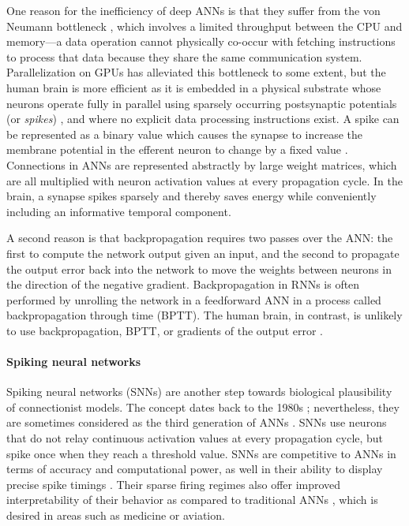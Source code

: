 One reason for the inefficiency of deep ANNs is that they suffer from the von Neumann bottleneck \citep{zenke2021brain}, which involves a limited throughput between the CPU and memory---a data operation cannot physically co-occur with fetching instructions to process that data because they share the same communication system.
Parallelization on GPUs has alleviated this bottleneck to some extent, but the human brain is more efficient as it is embedded in a physical substrate whose neurons operate fully in parallel \citep{a2017parallel} using sparsely occurring postsynaptic potentials (or \emph{spikes}) \citep{bear2020neuroscience}, and where no explicit data processing instructions exist.
A spike can be represented as a binary value which causes the synapse to increase the membrane potential in the efferent neuron to change by a fixed value \citep{bear2020neuroscience}.
Connections in ANNs are represented abstractly by large weight matrices, which are all multiplied with neuron activation values at every propagation cycle.
In the brain, a synapse spikes sparsely and thereby saves energy while conveniently including an informative temporal component.

A second reason is that backpropagation requires two passes over the ANN: the first to compute the network output given an input, and the second to propagate the output error back into the network to move the weights between neurons in the direction of the negative gradient.
Backpropagation in RNNs is often performed by unrolling the network in a feedforward ANN in a process called backpropagation through time (BPTT).
The human brain, in contrast, is unlikely to use backpropagation, BPTT, or gradients of the output error \citep{lillicrap2019backpropagation}.

\paragraph{Spiking neural networks}
Spiking neural networks (SNNs) \citep{maass1997networks,gerstner2002spiking} are another step towards biological plausibility of connectionist models.
The concept dates back to the 1980s \citep{hopfield1982neural}; nevertheless, they are sometimes considered as the third generation of ANNs \citep{maass1997networks}.
SNNs use neurons that do not relay continuous activation values at every propagation cycle, but spike once when they reach a threshold value.
SNNs are competitive to ANNs in terms of accuracy and computational power, as well in their ability to display precise spike timings \citep{lobo2020spiking}.
Their sparse firing regimes also offer improved interpretability of their behavior as compared to traditional ANNs \citep{soltic2010knowledge}, which is desired in areas such as medicine or aviation.


